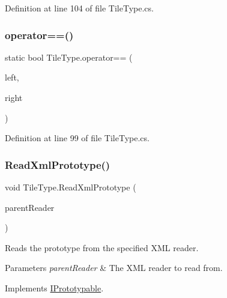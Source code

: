 Definition at line 104 of file Tile\+Type.\+cs.

\mbox{\label{class_tile_type_a626a9795ec9334cd621342faab6fa6e4}} 
\subsubsection{\texorpdfstring{operator==()}{operator==()}}
{\footnotesize\ttfamily static bool Tile\+Type.\+operator== (\begin{DoxyParamCaption}\item[{\hyperlink{class_tile_type}{Tile\+Type}}]{left,  }\item[{\hyperlink{class_tile_type}{Tile\+Type}}]{right }\end{DoxyParamCaption})\hspace{0.3cm}{\ttfamily [static]}}



Definition at line 99 of file Tile\+Type.\+cs.

\mbox{\label{class_tile_type_ae39d2b8e69a19ad1aedcd8ad9ab19727}} 
\subsubsection{\texorpdfstring{Read\+Xml\+Prototype()}{ReadXmlPrototype()}}
{\footnotesize\ttfamily void Tile\+Type.\+Read\+Xml\+Prototype (\begin{DoxyParamCaption}\item[{Xml\+Reader}]{parent\+Reader }\end{DoxyParamCaption})}



Reads the prototype from the specified X\+ML reader. 


\begin{DoxyParams}{Parameters}
{\em parent\+Reader} & The X\+ML reader to read from.\\
\hline
\end{DoxyParams}


Implements \hyperlink{interface_i_prototypable_a024d752c4be655a7166db5718f1fad6a}{I\+Prototypable}.



